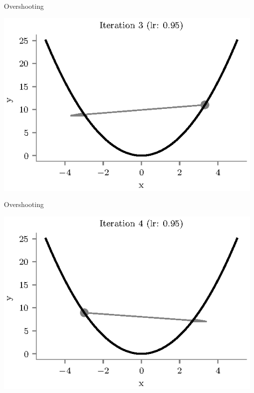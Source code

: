 \documentclass{beamer}
\begin{document}
\begin{frame}{Overshooting}
\begin{center}
\includegraphics[totalheight=6cm]{overshooting-3.eps}
\end{center}
\end{frame}

\begin{frame}{Overshooting}
\begin{center}
\includegraphics[totalheight=6cm]{overshooting-4.eps}
\end{center}
\end{frame}
\end{document}

